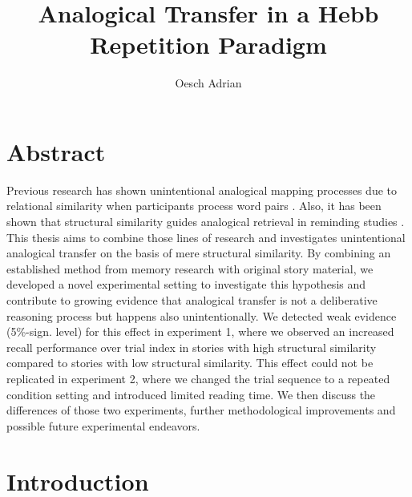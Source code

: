 \documentclass[a4paper,man,natbib,floatsintext,import]{apa6}
\title{Analogical Transfer in a Hebb Repetition Paradigm}
\author{Oesch Adrian}
\affiliation{University of Zurich}
\begin{document}

\section*{Abstract}
Previous research has shown unintentional analogical mapping processes due to relational similarity when participants process word pairs \citep{Popov2015,Estes2006}. Also, it has been shown that structural similarity guides analogical retrieval in reminding studies \citep{Wharton1996}. This thesis aims to combine those lines of research and investigates unintentional analogical transfer on the basis of mere structural similarity. By combining an established method from memory research with original story material, we developed a novel experimental setting to investigate this hypothesis and contribute to growing evidence that analogical transfer is not a deliberative reasoning process but happens also unintentionally. We detected weak evidence (5\%-sign. level) for this effect in experiment 1, where we observed an increased recall performance over trial index in stories with high structural similarity compared to stories with low structural similarity. This effect could not be replicated in experiment 2, where we changed the trial sequence to a repeated condition setting and introduced limited reading time. We then discuss the differences of those two experiments, further methodological improvements and possible future experimental endeavors.

\newpage
\tableofcontents

\newpage
\section{Introduction}
\end{document}
